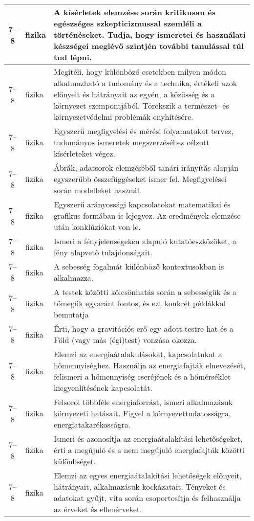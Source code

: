 \begin{small}
\begin{longtable}{c | p{2cm} |  p{11cm} }
              7--8 & fizika & A kísérletek elemzése során kritikusan és egészséges szkepticizmussal szemléli a történéseket. Tudja, hogy ismeretei és használati készségei meglévő szintjén további tanulással túl tud lépni. \\ \hline
              7--8 & fizika & Megítéli, hogy különböző esetekben milyen módon alkalmazható a tudomány és a technika, értékeli azok előnyeit és hátrányait az egyén, a közösség és a környezet szempontjából. Törekszik a természet- és környezetvédelmi problémák enyhítésére. \\ \hline
              7--8 & fizika & Egyszerű megfigyelési és mérési folyamatokat tervez, tudományos ismeretek megszerzéséhez célzott kísérleteket végez. \\ \hline
              7--8 & fizika & Ábrák, adatsorok elemzéséből tanári irányítás alapján egyszerűbb összefüggéseket ismer fel. Megfigyelései során modelleket használ.  \\ \hline
              7--8 & fizika & Egyszerű arányossági kapcsolatokat matematikai és grafikus formában is lejegyez. Az eredmények elemzése után konklúziókat von le. \\ \hline
              7--8 & fizika & Ismeri a fényjelenségeken alapuló kutatóeszközöket, a fény alapvető tulajdonságait. \\ \hline
              7--8 & fizika & A sebesség fogalmát különböző kontextusokban is alkalmazza. \\ \hline
              7--8 & fizika & A testek közötti kölcsönhatás során a sebességük és a tömegük egyaránt fontos, és ezt konkrét példákkal bemutatja \\ \hline
              7--8 & fizika & Érti, hogy a gravitációs erő egy adott testre hat és a Föld (vagy más (égi)test) vonzása okozza. \\ \hline
              7--8 & fizika & Elemzi az energiaátalakulásokat, kapcsolatukat a hőmennyiséghez. Használja az energiafajták elnevezését, felismeri a hőmennyiség cseréjének és a hőmérséklet kiegyenlítésének kapcsolatát. \\ \hline
              7--8 & fizika & Felsorol többféle energiaforrást, ismeri alkalmazásuk környezeti hatásait. Figyel a környezettudatosságra, energiatakarékosságra. \\ \hline
              7--8 & fizika & Ismeri és azonosítja az energiaátalakítási lehetőségeket, érti a megújuló és a nem megújuló energiafajták közötti különbséget. \\ \hline
              7--8 & fizika & Elemzi az egyes energiaátalakítási lehetőségek előnyeit, hátrányait, alkalmazásuk kockázatait. Tényeket és adatokat gyűjt, vita során csoportosítja és felhasználja az érveket és ellenérveket. \\ \hline

\end{longtable}
\end{small}
